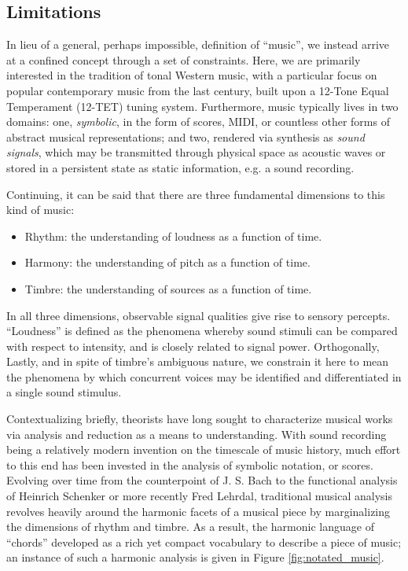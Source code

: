 \subsection{Limitations}
\label{subsec:limitations}

In lieu of a general, perhaps impossible, definition of ``music'', we instead arrive at a confined concept through a set of constraints.
Here, we are primarily interested in the tradition of tonal Western music, with a particular focus on popular contemporary music from the last century, built upon a 12-Tone Equal Temperament (12-TET) tuning system.
Furthermore, music typically lives in two domains: one, \emph{symbolic}, in the form of scores, MIDI, or countless other forms of abstract musical representations; and two, rendered via synthesis as \emph{sound signals}, which may be transmitted through physical space as acoustic waves or stored in a persistent state as static information, e.g. a sound recording.

Continuing, it can be said that there are three fundamental dimensions to this kind of music:

\begin{itemize}
\item Rhythm: the understanding of loudness as a function of time.
\item Harmony: the understanding of pitch as a function of time.
\item Timbre: the understanding of sources as a function of time.
\end{itemize}

In all three dimensions, observable signal qualities give rise to sensory percepts.
``Loudness'' is defined as the phenomena whereby sound stimuli can be compared with respect to intensity, and is closely related to signal power.
Orthogonally,
Lastly, and in spite of timbre's ambiguous nature, we constrain it here to mean the phenomena by which concurrent voices may be identified and differentiated in a single sound stimulus.

Contextualizing briefly, theorists have long sought to characterize musical works via analysis and reduction as a means to understanding.
With sound recording being a relatively modern invention on the timescale of music history, much effort to this end has been invested in the analysis of symbolic notation, or scores.
Evolving over time from the counterpoint of J. S. Bach to the functional analysis of Heinrich Schenker or more recently Fred Lehrdal, traditional musical analysis revolves heavily around the harmonic facets of a musical piece by marginalizing the dimensions of rhythm and timbre.
As a result, the harmonic language of ``chords'' developed as a rich yet compact vocabulary to describe a piece of music; an instance of such a harmonic analysis is given in Figure \ref{fig:notated_music}.

